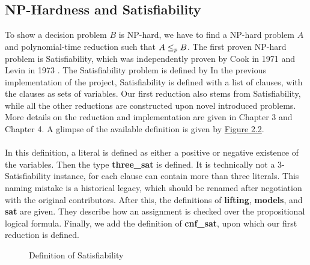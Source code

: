 \subsection*{NP-Hardness and Satisfiability}
To show a decision problem $B$ is NP-hard, 
we have to find a NP-hard problem $A$ and polynomial-time reduction 
such that $A \leq_p B$. The first proven NP-hard problem is Satisfiability, 
which was independently proven by Cook in 1971 \cite{cook2023complexity} and Levin in 1973 \cite{levin1973universal}. 
The Satisfiability problem is defined by 
In the previous implementation of the project, Satisfiability is defined with a list of clauses, with the clauses as sets of variables.
Our first reduction also stems from Satisfiability, while all the other reductions are constructed upon novel introduced problems. 
More details on the reduction and implementation are given in Chapter 3 and Chapter 4. A glimpse of the available 
definition is given by \hyperref[figure:2]{Figure 2.2}. \\\\
In this definition, a literal is defined as either a positive or negative existence of the variables. Then 
the type \textbf{three\_sat} is defined. It is technically not a 3-Satisfiability instance, for each clause can 
contain more than three literals. This naming mistake is a historical legacy, which should be renamed after negotiation with the original contributors.
After this, the definitions of \textbf{lifting}, \textbf{models}, and \textbf{sat} are given. They describe how an assignment is checked over the propositional 
logical formula. Finally, we add the definition of \textbf{cnf\_sat}, upon which our first reduction is defined.
\begin{figure}[!h]
    \caption{Definition of Satisfiability}
    \label{figure:2}
\end{figure}

